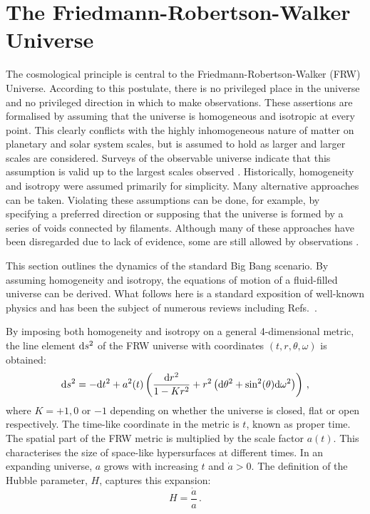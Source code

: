 \section{The Friedmann-Robertson-Walker Universe}
\label{sec:frw-intro}
The cosmological principle is central to the Friedmann-Robertson-Walker
(FRW\footnotemark) Universe. 
According to this postulate, there is no privileged
place in the universe and no privileged direction in which to make observations.
These assertions
are formalised by assuming that the universe is homogeneous and isotropic at
every point. This clearly conflicts with the highly inhomogeneous nature of matter
on planetary and solar system scales, but is assumed to hold as larger and larger
scales are considered.
Surveys of the observable universe indicate that this assumption is valid up to
the largest
scales observed \cite{Colless:2001gk, York:2000gk}. 
Historically, homogeneity and isotropy were assumed primarily for simplicity.
Many alternative approaches can be taken. Violating these assumptions can
be done, for example, by specifying a preferred direction or supposing that the
universe is formed by a series of voids connected by filaments. Although many
of these approaches have been disregarded due to lack of evidence, some are still
allowed by observations
\cite{GarciaBellido:2008nz,Alexander:2007xx,Alnes:2005rw,Hunt:2008wp}.

This section outlines the dynamics of the standard Big Bang scenario.
By assuming homogeneity and isotropy, the equations of motion of a
fluid-filled universe can be derived. What follows here is a
standard exposition of well-known physics and has been the subject of
numerous reviews including Refs.~\cite{book:kolbturner, book:kip, book:liddle}.


By imposing both homogeneity and isotropy on a general 4-dimensional metric, the
line element $\mathrm{d} s^2$ of the FRW universe with coordinates $(t,r,\theta,\omega)$
is obtained:
% 
\begin{equation}
 \label{eq:frwmetric-intro}
\mathrm{d} s^2 = -\mathrm{d} t^2 + a^2(t)
  \left( 
    \frac{\mathrm{d} r^2}{1-Kr^2} + r^2\left(\mathrm{d}\theta^2 + \sin^2(\theta)
\mathrm{d}\omega^2\right)
  \right)\,,
\end{equation}
% 
where $K=+1, 0$ or $-1$ depending on whether the universe is closed, flat
or open respectively. The time-like coordinate in the metric is $t$, known as
proper time. 
% 
The spatial part of the FRW metric is multiplied by the scale factor $a(t)$.
This characterises the size of space-like hypersurfaces at
different times. In an expanding universe, $a$ grows with
increasing $t$ and $\dot{a}>0$.
The definition of the Hubble parameter, $H$, captures this expansion:
\begin{equation}
 \label{eq:Hdefn-intro}
  H = \frac{\dot{a}}{a} \,.
\end{equation}
%


